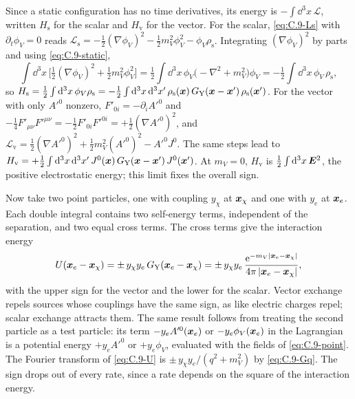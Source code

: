 Since a static configuration has no time derivatives, its energy is $-\int\dd^3x\,\mathcal{L}$, written $H_{\mathrm{s}}$ for the scalar and $H_{\mathrm{v}}$ for the vector. For the scalar, \cref{eq:C.9-Ls} with $\partial_t\phi_V = 0$ reads $\mathcal{L}_{\mathrm{s}} = -\tfrac12(\nabla\phi_V)^2 - \tfrac12 m_V^2\phi_V^2 - \phi_V\rho_{\mathrm{s}}$. Integrating $(\nabla\phi_V)^2$ by parts and using \cref{eq:C.9-static},
\begin{equation*}
  \int\dd^3x\,\bigl[\tfrac12(\nabla\phi_V)^2 + \tfrac12 m_V^2\phi_V^2\bigr]
  = \tfrac12\int\dd^3x\,\phi_V\bigl(-\nabla^2 + m_V^2\bigr)\phi_V
  = -\tfrac12\int\dd^3x\,\phi_V\,\rho_{\mathrm{s}},
\end{equation*}
so $H_{\mathrm{s}} = \tfrac12\int\mathrm{d}^3x\,\phi_V\rho_{\mathrm{s}} = -\tfrac12\int\mathrm{d}^3x\,\mathrm{d}^3x'\,\rho_{\mathrm{s}}(\bm{x})\,G_{\mathrm{Y}}(\bm{x} - \bm{x}')\,\rho_{\mathrm{s}}(\bm{x}')$.
For the vector with only $A'^0$ nonzero, $F'_{0i} = -\partial_i A'^0$ and $-\tfrac14 F'_{\mu\nu}F'^{\mu\nu} = -\tfrac12 F'_{0i}F'^{0i} = +\tfrac12(\nabla A'^0)^2$, and $\mathcal{L}_{\mathrm{v}} = \tfrac12(\nabla A'^0)^2 + \tfrac12 m_V^2 (A'^0)^2 - A'^0 J^0$. The same steps lead to $H_{\mathrm{v}} = +\tfrac12\int\mathrm{d}^3x\,\mathrm{d}^3x'\,J^0(\bm{x})\,G_{\mathrm{Y}}(\bm{x} - \bm{x}')\,J^0(\bm{x}')$. At $m_V = 0$, $H_{\mathrm{v}}$ is $\tfrac12\int\mathrm{d}^3x\,\bm{E}^2$, the positive electrostatic energy; this limit fixes the overall sign.

Now take two point particles, one with coupling $y_\chi$ at $\bm{x}_\chi$ and one with $y_e$ at $\bm{x}_e$. Each double integral contains two self-energy terms, independent of the separation, and two equal cross terms. The cross terms give the interaction energy
\begin{equation}
  U(\bm{x}_e - \bm{x}_\chi) = \pm\, y_\chi y_e\, G_{\mathrm{Y}}(\bm{x}_e - \bm{x}_\chi)
  = \pm\, y_\chi y_e\,\frac{\mathrm{e}^{-m_V|\bm{x}_e - \bm{x}_\chi|}}{4\pi\,|\bm{x}_e - \bm{x}_\chi|},
  \label{eq:C.9-U}
\end{equation}
with the upper sign for the vector and the lower for the scalar. Vector exchange repels sources whose couplings have the same sign, as like electric charges repel; scalar exchange attracts them. The same result follows from treating the second particle as a test particle: its term $-y_e A'^0(\bm{x}_e)$ or $-y_e\phi_V(\bm{x}_e)$ in the Lagrangian is a potential energy $+y_e A'^0$ or $+y_e\phi_V$, evaluated with the fields of \cref{eq:C.9-point}. The Fourier transform of \cref{eq:C.9-U} is $\pm\,y_\chi y_e/(q^2 + m_V^2)$ by \cref{eq:C.9-Gq}. The sign drops out of every rate, since a rate depends on the square of the interaction energy.

